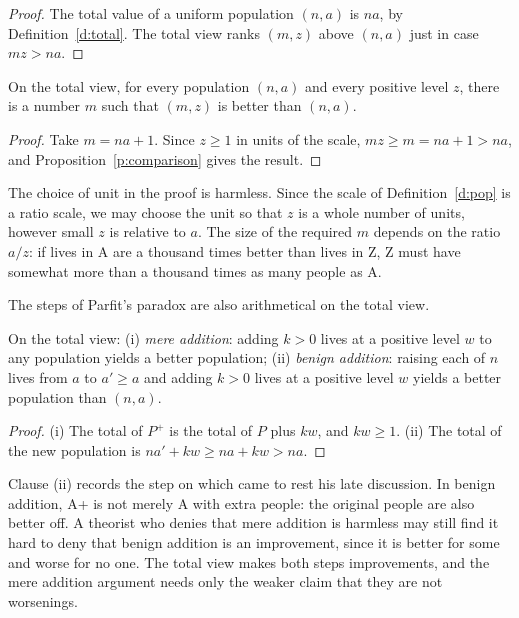 \documentclass{situationist-preprint}
\begin{document}
\begin{proof}
The total value of a uniform population $(n,a)$ is $na$, by Definition~\ref{d:total}. The total view ranks $(m,z)$ above $(n,a)$ just in case $mz > na$.
\end{proof}

\begin{theorem}\label{t:rctotal}
On the total view, for every population $(n,a)$ and every positive level $z$, there is a number $m$ such that $(m,z)$ is better than $(n,a)$.
\end{theorem}

\begin{proof}
Take $m = na + 1$. Since $z \geq 1$ in units of the scale, $mz \geq m = na + 1 > na$, and Proposition~\ref{p:comparison} gives the result.
\end{proof}

The choice of unit in the proof is harmless. Since the scale of Definition~\ref{d:pop} is a ratio scale, we may choose the unit so that $z$ is a whole number of units, however small $z$ is relative to $a$. The size of the required $m$ depends on the ratio $a/z$: if lives in A are a thousand times better than lives in Z, Z must have somewhat more than a thousand times as many people as A.

The steps of Parfit's paradox are also arithmetical on the total view.

\begin{lemma}\label{l:addition}
On the total view: (i) \emph{mere addition}: adding $k > 0$ lives at a positive level $w$ to any population yields a better population; (ii) \emph{benign addition}: raising each of $n$ lives from $a$ to $a' \geq a$ and adding $k > 0$ lives at a positive level $w$ yields a better population than $(n,a)$.
\end{lemma}

\begin{proof}
(i) The total of $P^{+}$ is the total of $P$ plus $kw$, and $kw \geq 1$. (ii) The total of the new population is $na' + kw \geq na + kw > na$.
\end{proof}

Clause (ii) records the step on which \citet{Parfit2016} came to rest his late discussion. In benign addition, A+ is not merely A with extra people: the original people are also better off. A theorist who denies that mere addition is harmless may still find it hard to deny that benign addition is an improvement, since it is better for some and worse for no one. The total view makes both steps improvements, and the mere addition argument needs only the weaker claim that they are not worsenings.
\end{document}

